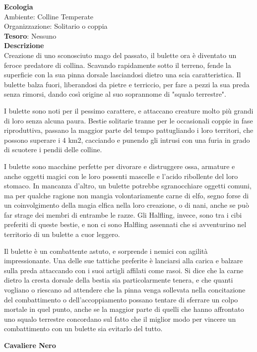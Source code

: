 \begin{multicols}{2}
	\textbf{Ecologia}\\
	Ambiente: Colline Temperate\\
	Organizzazione: Solitario o coppia\\
	\textbf{Tesoro}: Nessuno\\
	\textbf{Descrizione}\\
	Creazione di uno sconosciuto mago del passato, il bulette ora è diventato un feroce predatore di collina. Scavando rapidamente sotto il terreno, fende la superficie con la sua pinna dorsale lasciandosi dietro una scia caratteristica. Il bulette balza fuori, liberandosi da pietre e terriccio, per fare a pezzi la sua preda senza rimorsi, dando così origine al suo soprannome di "squalo terrestre".

	I bulette sono noti per il pessimo carattere, e attaccano creature molto più grandi di loro senza alcuna paura. Bestie solitarie tranne per le occasionali coppie in fase riproduttiva, passano la maggior parte del tempo pattugliando i loro territori, che possono superare i 4 km2, cacciando e punendo gli intrusi con una furia in grado di scuotere i pendii delle colline.

	I bulette sono macchine perfette per divorare e distruggere ossa, armature e anche oggetti magici con le loro possenti mascelle e l'acido ribollente del loro stomaco. In mancanza d'altro, un bulette potrebbe sgranocchiare oggetti comuni, ma per qualche ragione non mangia volontariamente carne di elfo, segno forse di un coinvolgimento della magia elfica nella loro creazione, o di nani, anche se può far strage dei membri di entrambe le razze. Gli Halfling, invece, sono tra i cibi preferiti di queste bestie, e non ci sono Halfling assennati che si avventurino nel territorio di un bulette a cuor leggero.

	Il bulette è un combattente astuto, e sorprende i nemici con agilità impressionante. Una delle sue tattiche preferite è lanciarsi alla carica e balzare sulla preda attaccando con i suoi artigli affilati come rasoi. Si dice che la carne dietro la cresta dorsale della bestia sia particolarmente tenera, e che quanti vogliano o riescano ad attendere che la pinna venga sollevata nella concitazione del combattimento o dell'accoppiamento possano tentare di sferrare un colpo mortale in quel punto, anche se la maggior parte di quelli che hanno affrontato uno squalo terrestre concordano sul fatto che il miglior modo per vincere un combattimento con un bulette sia evitarlo del tutto.

	\medskip{}\textbf{Cavaliere Nero}


\end{multicols}
